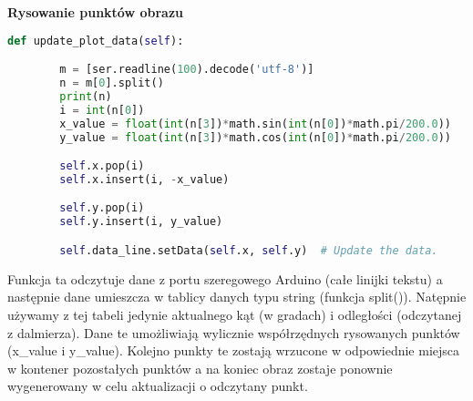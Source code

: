 \textbf{Rysowanie punktów obrazu}

\begin{lstlisting}[language=Python, caption=Rysowanie obrazu]
    def update_plot_data(self):

        m = [ser.readline(100).decode('utf-8')]
        n = m[0].split()
        print(n)
        i = int(n[0])
        x_value = float(int(n[3])*math.sin(int(n[0])*math.pi/200.0))
        y_value = float(int(n[3])*math.cos(int(n[0])*math.pi/200.0))

        self.x.pop(i)
        self.x.insert(i, -x_value)

        self.y.pop(i)
        self.y.insert(i, y_value)

        self.data_line.setData(self.x, self.y)  # Update the data.
\end{lstlisting}

Funkcja ta odczytuje dane z portu szeregowego Arduino (całe linijki tekstu) a następnie dane umieszcza w tablicy danych typu string (funkcja split()). Natępnie używamy z tej tabeli jedynie aktualnego kąt (w gradach) i odległości (odczytanej z dalmierza). Dane te umożliwiają wylicznie współrzędnych rysowanych punktów (x\_value i y\_value). Kolejno punkty te zostają wrzucone w odpowiednie miejsca w kontener pozostałych punktów a na koniec obraz zostaje ponownie wygenerowany w celu aktualizacji o odczytany punkt.